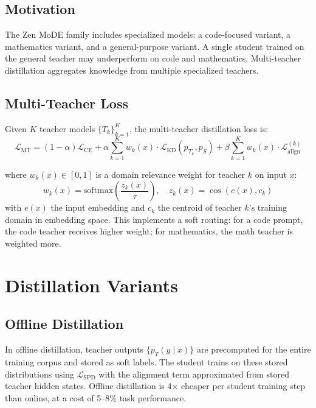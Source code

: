 \documentclass[11pt,a4paper]{article}
\begin{document}
\subsection{Motivation}

The Zen MoDE family includes specialized models: a code-focused variant, a mathematics
variant, and a general-purpose variant. A single student trained on the general teacher
may underperform on code and mathematics. Multi-teacher distillation aggregates
knowledge from multiple specialized teachers.

\subsection{Multi-Teacher Loss}

Given $K$ teacher models $\{T_k\}_{k=1}^K$, the multi-teacher distillation loss is:
\begin{equation}
    \mathcal{L}_{\text{MT}} = (1-\alpha)\mathcal{L}_{\text{CE}} +
    \alpha \sum_{k=1}^{K} w_k(x) \cdot \mathcal{L}_{\text{KD}}(p_{T_k}, p_S) +
    \beta \sum_{k=1}^{K} w_k(x) \cdot \mathcal{L}_{\text{align}}^{(k)}
    \label{eq:mt_loss}
\end{equation}

where $w_k(x) \in [0,1]$ is a domain relevance weight for teacher $k$ on input $x$:
\begin{equation}
    w_k(x) = \text{softmax}\!\left(\frac{z_k(x)}{\tau}\right), \quad
    z_k(x) = \cos(e(x), c_k)
    \label{eq:teacher_weight}
\end{equation}
with $e(x)$ the input embedding and $c_k$ the centroid of teacher $k$'s training domain
in embedding space. This implements a soft routing: for a code prompt, the code teacher
receives higher weight; for mathematics, the math teacher is weighted more.

\section{Distillation Variants}
\label{sec:variants}

\subsection{Offline Distillation}

In offline distillation, teacher outputs $\{p_T(y \mid x)\}$ are precomputed for the
entire training corpus and stored as soft labels. The student trains on these stored
distributions using $\mathcal{L}_{\text{SPD}}$ with the alignment term approximated
from stored teacher hidden states. Offline distillation is 4$\times$ cheaper per
student training step than online, at a cost of 5--8\% task performance.
\end{document}
